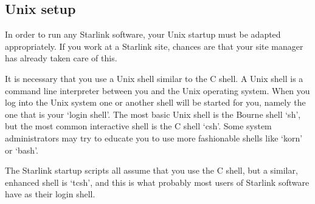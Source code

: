 \documentclass[11pt,twoside]{article}
\newcommand{\htmladdimg}[1]{}
\newenvironment{latexonly}{}{}
\newcommand{\xlabel}[1]{}
\begin{document}

%
%
%
%
%
%
%
%
%
%


\subsection{\xlabel{unix_setup}\label{unixstart}Unix setup}

   In order to run any Starlink software, your Unix startup must be
   adapted appropriately. If you work at a Starlink site, chances are
   that your site manager has already taken care of this.

   It is necessary that you use a Unix shell similar to the C shell.
   A Unix shell is a command line interpreter between you and the Unix
   operating system. When you log into the Unix system one or another
   shell will be started for you, namely the one that is your `login
   shell'. The most basic Unix shell is the Bourne shell `sh', but the
   most common interactive shell is the C shell `csh'. Some system
   administrators may try to educate you to use more fashionable shells
   like `korn' or `bash'.

   The Starlink startup scripts all assume that you use the C shell, but
   a similar, enhanced shell is `tcsh', and this is what probably most
   users of Starlink software have as their login shell.
\end{document}

